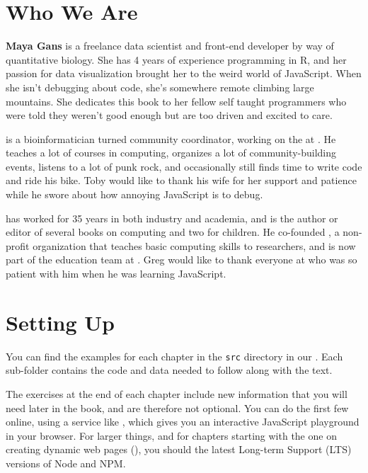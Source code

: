 \section{Who We Are}\label{s:intro-contributors}

\textbf{Maya Gans} is a freelance data scientist and front-end developer by way of quantitative biology. 
She has 4 years of experience programming in R, 
and her passion for data visualization brought her to the weird world of JavaScript. 
When she isn't debugging  about code, 
she's somewhere remote climbing large mountains. 
She dedicates this book to her fellow self taught programmers who were told they weren’t good enough
but are too driven and excited to care.

\textbf{} is a bioinformatician turned community
coordinator, working on the  at
. He teaches a lot of courses in computing, organizes
a lot of community-building events, listens to a lot of punk rock, and
occasionally still finds time to write code and ride his bike. Toby would like
to thank his wife for her support and patience while he swore about how annoying
JavaScript is to debug.

\textbf{} has worked for 35 years in both industry and
academia, and is the author or editor of several books on computing and two for
children. He co-founded , a non-profit
organization that teaches basic computing skills to researchers, and is now part
of the education team at . Greg would like to
thank everyone at  who was so patient with him when
he was learning JavaScript.

\section{Setting Up}\label{s:intro-setup}

You can find the examples for each chapter in the \texttt{src} directory
in our .
Each sub-folder contains the code and data needed to follow along with the text.

The exercises at the end of each chapter include new information
that you will need later in the book,
and are therefore not optional.
You can do the first few online,
using a service like ,
which gives you an interactive JavaScript playground in your browser.
For larger things,
and for chapters starting with the one on creating dynamic web pages (),
you should  the latest Long-term Support (LTS) versions of Node and NPM.

